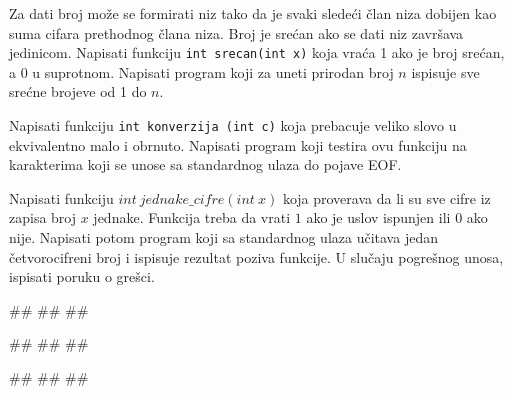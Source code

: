 \begin{Exercise}[label=v1.4_13] 
Za dati broj može se formirati niz tako da je svaki sledeći član niza dobijen
kao suma cifara prethodnog člana niza. Broj je srećan ako se dati niz završava 
jedinicom. Napisati funkciju 
\verb|int srecan(int x)|
 koja vraća 1 ako je broj srećan, a 0 u suprotnom. Napisati program koji za uneti prirodan broj $n$ ispisuje sve srećne brojeve od 1 do $n$.\\ 
\end{Exercise}
\begin{Answer}[ref=v1.4_13]
\end{Answer}

\begin{Exercise}[label=v1.4_14] 
Napisati funkciju 
\verb|int konverzija (int c)|
koja prebacuje veliko slovo u ekvivalentno malo i obrnuto. Napisati program koji testira ovu funkciju na karakterima koji se unose sa standardnog ulaza do pojave EOF.\\ 
\end{Exercise}
\begin{Answer}[ref=v1.4_14]
\end{Answer}


\iffalse
\item Napisati funkciju $int\ jednake\_cifre(int\ x)$ koja proverava da li su sve cifre iz zapisa broj $x$ jednake. Funkcija treba da vrati  $1$ ako je uslov ispunjen ili $0$ ako nije. Napisati potom program koji sa standardnog ulaza učitava jedan četvorocifreni broj i ispisuje rezultat poziva funkcije. U slučaju pogrešnog unosa, ispisati poruku o grešci. 

\begin{miditest}
\begin{upotreba}{1}
#\naslovInt#
##
##
\end{upotreba}
\end{miditest}
\begin{miditest}
\begin{upotreba}{2}
#\naslovInt#
##
##
\end{upotreba}
\end{miditest}

\begin{miditest}
\begin{upotreba}{3}
#\naslovInt#
##
##
\end{upotreba}
\end{miditest}

